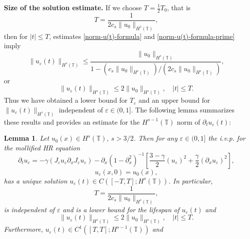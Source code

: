 \documentclass[12pt,reqno]{amsart}
\newcommand{\p}{\partial}
\newcommand{\ci}{\mathbb{T}}
\newcommand{\ee}{\varepsilon}
\theoremstyle{plain}  %
\newtheorem{lemma}{Lemma}
\theoremstyle{definition}
\begin{document}
\begin{appendices}
\begin{equation}
	\end{equation}
	\noindent
	{\bf  Size of the solution estimate.} If we choose  $T=\frac12 T_0$, that is
	\begin{equation} 
		\label{T-def}
		T
		=
		\frac{1}{2 c_s \|u_0\|_{H^s(\ci)}},
	\end{equation}
	then for $|t| \le T$, estimates \eqref{norm-u(t)-formula} and
	\eqref{norm-u(t)-formula-prime} imply 
	\begin{equation*} 
		\label{u(t)-u(0)-bound}
		\|u_\ee(t)\|_{H^s(\ci)}
		\le
		\frac{ \|u_0\|_{H^s(\ci)}}{1-(c_s\|u_0\|_{H^s(\ci)})/(2 c_s \|u_0\|_{H^s(\ci)})},
	\end{equation*}
	or 
	\begin{equation} 
		\|u_\ee(t)\|_{H^s(\ci)}
		\le
		  2 \|u_0\|_{H^s(\ci)},
		\quad 
		|t| \le T.
	\end{equation}
	\vskip0.1in
	Thus we have obtained a lower bound for $T_\ee$ and an upper bound for
	$\|u_\ee(t)\|_{H^s(\ci)}$ independent of $\ee\in (0, 1]$. The following
	lemma summarizes these results and provides an estimate for the
	$H^{s-1}(\ci)$ norm of $\p_t u_\ee(t)$:
	\begin{lemma}
		\label{hr_wp}
		Let  $u_0(x) \in  H^s(\ci)$, $s >3/2$. Then for any $\ee\in (0, 1]$
		the i.v.p. for the mollified HR equation 
		\begin{equation} 
			\label{hr-moli-2}
			\partial_t  u_\ee 
			=
			-\gamma (J_\ee u_\ee \partial_x  J_\ee  u_\ee) - \p_x (1-\p_x^2)^{-1} \left
			[\frac{3-\gamma}{2}(u_\ee)^2 + \frac{\gamma}{2}(\p_x u_\ee)^2
			\right ], 
		\end{equation} 
		\begin{equation} 
			\label{burgers-moli-data-2} 
			u_\ee(x, 0) = u_0 (x),
		\end{equation}
		has a unique solution $u_\ee( t)\in C([-T, T]; H^s(\ci))$. 
		In particular,
		\begin{equation} 
			\label{life-est}
			T
			=
			\frac{1}{2 c_s \|u_0\|_{H^s(\ci)}},
		\end{equation}
		is independent of $\ee$ and
		is a lower bound for the lifespan of $u_\ee( t)$ and
		\begin{equation}
			\label{u-e-Hs-bound}
			\|u_\ee(t)\|_{H^s(\ci)}
			\le
			2 \|u_0 \|_{H^s(\ci)},
			\quad
			|t| \le T.
		\end{equation}
		Furthermore,  $u_\ee( t)\in C^1([T, T]; H^{s-1}(\ci))$ and 

\end{lemma}
\end{appendices}
\end{document}
